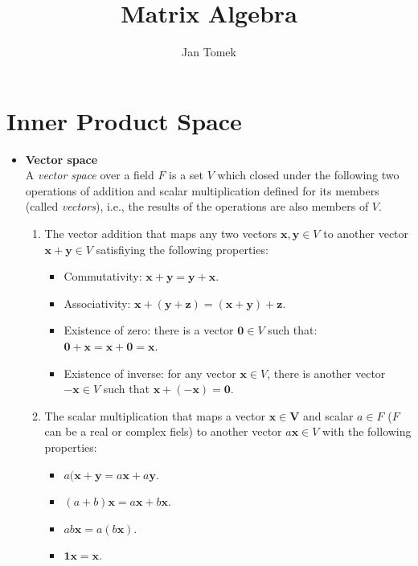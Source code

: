 \documentclass[10pt,b5paper,titlepage]{book}
\author{Jan Tomek}
\title{Matrix Algebra}
\begin{document}
\maketitle

\tableofcontents

\chapter{Inner Product Space}

\begin{itemize}
    \item \textbf{Vector space}\\

        A \textit{vector space} over a field $F$ is a set $V$ which closed under
        the following two operations of addition and scalar multiplication
        defined for its members (called \textit{vectors}), i.e., the results
        of the operations are also members of $V$.

        \begin{enumerate}
            \item The vector addition that maps any two vectors
                $\mathbf{x}, \mathbf{y} \in V$ to another vector
                $\mathbf{x} + \mathbf{y} \in V$ satisfiying the following
                properties:
                \begin{itemize}
                    \item Commutativity: $\mathbf{x} + \mathbf{y} = \mathbf{y} + \mathbf{x}$.
                    \item Associativity: $\mathbf{x} + (\mathbf{y} + \mathbf{z}) = (\mathbf{x} + \mathbf{y}) + \mathbf{z}$.
                    \item Existence of zero: there is a vector $\mathbf{0} \in V$ such that: $\mathbf{0} + \mathbf{x} = \mathbf{x} + \mathbf{0} = \mathbf{x}$.
                    \item Existence of inverse: for any vector $\mathbf{x} \in V$,
                        there is another vector $-\mathbf{x} \in V$ such that $\mathbf{x} + (- \mathbf{x}) = \mathbf{0}$.
                \end{itemize}
            \item The scalar multiplication that maps a vector $\mathbf{x \in V}$
                and scalar $a \in F$ ($F$ can be a real or complex fiels) to another
                vector $a \mathbf{x} \in V$ with the following properties:

                \begin{itemize}
                    \item $a (\mathbf{x} + \mathbf{y} = a \mathbf{x} + a \mathbf{y}$.
                    \item $(a + b) \mathbf{x} = a \mathbf{x} + b \mathbf{x}$.
                    \item $a b \mathbf{x} = a (b \mathbf{x})$.
                    \item $\mathbf{1} \mathbf{x} = \mathbf{x}$.
                \end{itemize}
        \end{enumerate}


\end{itemize}
\end{document}
